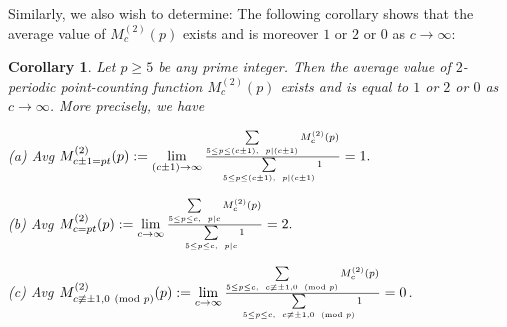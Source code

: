\documentclass{article}
\theoremstyle{plain}
\newtheorem{cor}[thm]{Corollary}
\theoremstyle{definition}
\begin{document}
Similarly, we also wish to determine:  The following corollary shows that the average value of $M_{c}^{(2)}(p)$ exists and is moreover $1$ or $2$ or $0$ as $c\to \infty$:

\begin{cor}\label{cor4.3}
Let $p\geq 5$ be any prime integer. Then the average value of $2$-periodic point-counting function $M_{c}^{(2)}(p)$ exists and is equal to $1$ or $2$ or $0$ as $c\to\infty$. More precisely, we have 
\begin{myitemize}
    \item[\textnormal{(a)}] \textnormal{Avg} $M_{c\pm1 = pt}^{(2)}(p) := \lim\limits_{(c\pm 1)\to\infty} \Large{\frac{\sum\limits_{5\leq p\leq (c\pm 1), \ p\mid (c\pm1)}M_{c}^{(2)}(p)}{\Large{\sum\limits_{5\leq p\leq (c\pm 1), \ p\mid (c\pm1)}1}}} = 1.$ 

    \item[\textnormal{(b)}] \textnormal{Avg} $M_{c= pt}^{(2)}(p) := \lim\limits_{c\to\infty} \Large{\frac{\sum\limits_{5\leq p\leq c, \ p\mid c}M_{c}^{(2)}(p)}{\Large{\sum\limits_{5\leq p\leq c, \ p\mid c}1}}} = 2.$
    
     \item[\textnormal{(c)}] \textnormal{Avg} $M_{c\not \equiv\pm1, 0 \ (\text{mod }p)}^{(2)}(p):= \lim\limits_{c \to\infty} \Large{\frac{\sum\limits_{5\leq p\leq c, \ c\not \equiv\pm1, 0 \ (\text{mod } p)}M_{c}^{(2)}(p)}{\Large{\sum\limits_{5\leq p\leq c, \ c\not \equiv\pm1, 0 \ (\text{mod } p)}1}}} =  0$.
\end{myitemize}

\end{cor}
\end{document}
